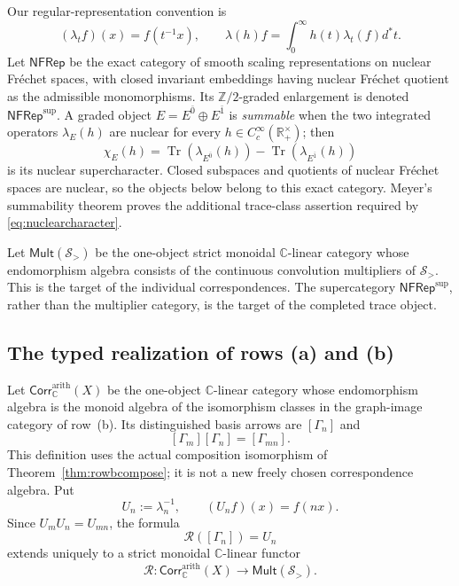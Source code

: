 \documentclass[11pt]{amsart}
\theoremstyle{definition}
\theoremstyle{remark}
\newcommand{\C}{\mathbb C}
\newcommand{\R}{\mathbb R}
\newcommand{\Z}{\mathbb Z}
\begin{document}
Our regular-representation convention is
\begin{equation}\label{eq:dilationconvention}
 (\lambda_t f)(x)=f(t^{-1}x),\qquad
 \lambda(h)f=\int_0^\infty h(t)\lambda_t(f)d^*t.
\end{equation}
Let $\mathsf{NFRep}$ be the exact category of smooth scaling
representations on nuclear Fr\'echet spaces, with closed invariant
embeddings having nuclear Fr\'echet quotient as the admissible
monomorphisms.  Its $\Z/2$-graded enlargement is denoted
$\mathsf{NFRep}^{\mathrm{sup}}$.  A graded object $E=E^{\bar0}\oplus
E^{\bar1}$ is \emph{summable} when the two integrated operators
$\lambda_E(h)$ are nuclear for every $h\in C_c^\infty(\R_+^\times)$; then
\begin{equation}\label{eq:nuclearcharacter}
 \chi_E(h)=\operatorname{Tr}(\lambda_{E^{\bar0}}(h))
           -\operatorname{Tr}(\lambda_{E^{\bar1}}(h))
\end{equation}
is its nuclear supercharacter.  Closed subspaces and quotients of nuclear
Fr\'echet spaces are nuclear, so the objects below belong to this exact
category.  Meyer's summability theorem
\cite[Proposition~5.6]{MeyerZeta} proves the additional trace-class
assertion required by \eqref{eq:nuclearcharacter}.

Let $\mathsf{Mult}(\mathcal S_>)$ be the one-object strict monoidal
$\C$-linear category whose endomorphism algebra consists of the continuous
convolution multipliers of $\mathcal S_>$.  This is the target of the
individual correspondences.  The supercategory
$\mathsf{NFRep}^{\mathrm{sup}}$, rather than the multiplier category, is the
target of the completed trace object.

\subsection{The typed realization of rows (a) and (b)}

Let $\mathsf{Corr}_{\C}^{\mathrm{arith}}(X)$ be the one-object
$\C$-linear category whose endomorphism algebra is the monoid algebra of
the isomorphism classes in the graph-image category of row~(b).  Its
distinguished basis arrows are $[\Gamma_n]$ and
\begin{equation}\label{eq:linearizedcomposition}
 [\Gamma_m][\Gamma_n]=[\Gamma_{mn}].
\end{equation}
This definition uses the actual composition isomorphism of
Theorem~\ref{thm:rowbcompose}; it is not a new freely chosen correspondence
algebra.  Put
\begin{equation}\label{eq:Un}
 U_n:=\lambda_n^{-1},\qquad (U_nf)(x)=f(nx).
\end{equation}
Since $U_mU_n=U_{mn}$, the formula
\begin{equation}\label{eq:Rfunctor}
 \mathcal R([\Gamma_n])=U_n
\end{equation}
extends uniquely to a strict monoidal $\C$-linear functor
\[
 \mathcal R:\mathsf{Corr}_{\C}^{\mathrm{arith}}(X)
       \longrightarrow\mathsf{Mult}(\mathcal S_>).
\]
\end{document}
